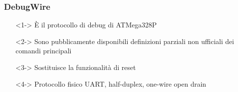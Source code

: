 \documentclass[aspectratio=169,
]{beamer}
\begin{document}
    \begin{frame}
        \frametitle{DebugWire}
    
        \begin{itemize}
            \item[]<1-> È il protocollo di debug di ATMega328P
            \item[]<2-> Sono pubblicamente disponibili definizioni parziali non ufficiali dei comandi principali
            \item[]<3-> Sostituisce la funzionalità di reset
            \item[]<4-> Protocollo fisico UART, half-duplex, one-wire open drain
        \end{itemize}
    \end{frame}

%
\end{document}
